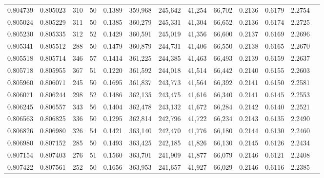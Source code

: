 \begin{tabular}{rrrrrrrrrrrrr}
0.804739 & 0.805023 &   310 &  50 &                                     0.1389 & 359,968 & 245,642 &  41,254 &  66,702 & 0.2136 & 0.6179 & 2.2754 \\
0.805024 & 0.805229 &   311 &  50 &                                     0.1385 & 360,279 & 245,331 &  41,304 &  66,652 & 0.2136 & 0.6174 & 2.2725 \\
0.805230 & 0.805335 &   312 &  52 &                                     0.1429 & 360,591 & 245,019 &  41,356 &  66,600 & 0.2137 & 0.6169 & 2.2696 \\
0.805341 & 0.805512 &   288 &  50 &                                     0.1479 & 360,879 & 244,731 &  41,406 &  66,550 & 0.2138 & 0.6165 & 2.2670 \\
0.805518 & 0.805714 &   346 &  57 &                                     0.1414 & 361,225 & 244,385 &  41,463 &  66,493 & 0.2139 & 0.6159 & 2.2637 \\
0.805718 & 0.805955 &   367 &  51 &                                     0.1220 & 361,592 & 244,018 &  41,514 &  66,442 & 0.2140 & 0.6155 & 2.2603 \\
0.805960 & 0.806071 &   245 &  50 &                                     0.1695 & 361,837 & 243,773 &  41,564 &  66,392 & 0.2141 & 0.6150 & 2.2581 \\
0.806071 & 0.806244 &   298 &  52 &                                     0.1486 & 362,135 & 243,475 &  41,616 &  66,340 & 0.2141 & 0.6145 & 2.2553 \\
0.806245 & 0.806557 &   343 &  56 &                                     0.1404 & 362,478 & 243,132 &  41,672 &  66,284 & 0.2142 & 0.6140 & 2.2521 \\
0.806563 & 0.806825 &   336 &  50 &                                     0.1295 & 362,814 & 242,796 &  41,722 &  66,234 & 0.2143 & 0.6135 & 2.2490 \\
0.806826 & 0.806980 &   326 &  54 &                                     0.1421 & 363,140 & 242,470 &  41,776 &  66,180 & 0.2144 & 0.6130 & 2.2460 \\
0.806980 & 0.807152 &   285 &  50 &                                     0.1493 & 363,425 & 242,185 &  41,826 &  66,130 & 0.2145 & 0.6126 & 2.2434 \\
0.807154 & 0.807403 &   276 &  51 &                                     0.1560 & 363,701 & 241,909 &  41,877 &  66,079 & 0.2146 & 0.6121 & 2.2408 \\
0.807422 & 0.807561 &   252 &  50 &                                     0.1656 & 363,953 & 241,657 &  41,927 &  66,029 & 0.2146 & 0.6116 & 2.2385 \\

\end{tabular}

